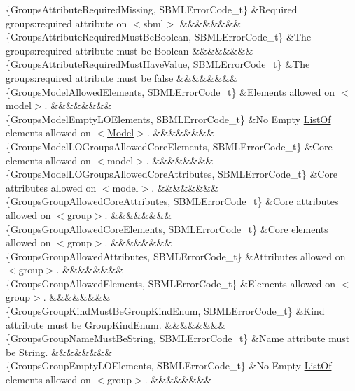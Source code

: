 \begin{DoxyParagraph}{}
\begin{longtabu}
\{Groups\+Attribute\+Required\+Missing, S\+B\+M\+L\+Error\+Code\+\_\+t\} &Required groups\+:required attribute on {\ttfamily $<$sbml$>$} &&&&&&&&\\
\{Groups\+Attribute\+Required\+Must\+Be\+Boolean, S\+B\+M\+L\+Error\+Code\+\_\+t\} &The groups\+:required attribute must be Boolean &&&&&&&&\\
\{Groups\+Attribute\+Required\+Must\+Have\+Value, S\+B\+M\+L\+Error\+Code\+\_\+t\} &The groups\+:required attribute must be \textquotesingle{}false\textquotesingle{} &&&&&&&&\\
\{Groups\+Model\+Allowed\+Elements, S\+B\+M\+L\+Error\+Code\+\_\+t\} &Elements allowed on {\ttfamily $<$model$>$}. &&&&&&&&\\
\{Groups\+Model\+Empty\+L\+O\+Elements, S\+B\+M\+L\+Error\+Code\+\_\+t\} &No Empty \hyperlink{class_list_of}{List\+Of} elements allowed on {\ttfamily $<$\hyperlink{class_model}{Model}$>$}. &&&&&&&&\\
\{Groups\+Model\+L\+O\+Groups\+Allowed\+Core\+Elements, S\+B\+M\+L\+Error\+Code\+\_\+t\} &Core elements allowed on {\ttfamily $<$model$>$}. &&&&&&&&\\
\{Groups\+Model\+L\+O\+Groups\+Allowed\+Core\+Attributes, S\+B\+M\+L\+Error\+Code\+\_\+t\} &Core attributes allowed on {\ttfamily $<$model$>$}. &&&&&&&&\\
\{Groups\+Group\+Allowed\+Core\+Attributes, S\+B\+M\+L\+Error\+Code\+\_\+t\} &Core attributes allowed on {\ttfamily $<$group$>$}. &&&&&&&&\\
\{Groups\+Group\+Allowed\+Core\+Elements, S\+B\+M\+L\+Error\+Code\+\_\+t\} &Core elements allowed on {\ttfamily $<$group$>$}. &&&&&&&&\\
\{Groups\+Group\+Allowed\+Attributes, S\+B\+M\+L\+Error\+Code\+\_\+t\} &Attributes allowed on {\ttfamily $<$group$>$}. &&&&&&&&\\
\{Groups\+Group\+Allowed\+Elements, S\+B\+M\+L\+Error\+Code\+\_\+t\} &Elements allowed on {\ttfamily $<$group$>$}. &&&&&&&&\\
\{Groups\+Group\+Kind\+Must\+Be\+Group\+Kind\+Enum, S\+B\+M\+L\+Error\+Code\+\_\+t\} &Kind attribute must be Group\+Kind\+Enum. &&&&&&&&\\
\{Groups\+Group\+Name\+Must\+Be\+String, S\+B\+M\+L\+Error\+Code\+\_\+t\} &Name attribute must be String. &&&&&&&&\\
\{Groups\+Group\+Empty\+L\+O\+Elements, S\+B\+M\+L\+Error\+Code\+\_\+t\} &No Empty \hyperlink{class_list_of}{List\+Of} elements allowed on {\ttfamily $<$group$>$}. &&&&&&&&\\

\end{longtabu}
\end{DoxyParagraph}
